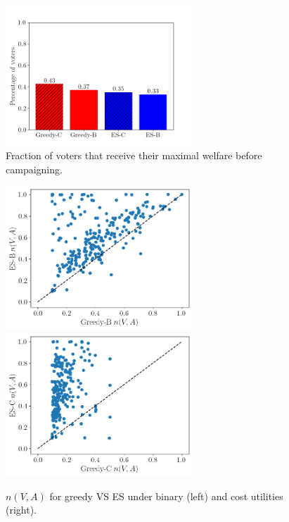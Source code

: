 \documentclass[mnsc,blindrev]{informs3_freeuse} %
\newcommand{\kibitz}[2]{\ifnum\Comments=1{\color{#1}{#2}}\fi}
\newcommand{\gb}[1]{\kibitz{red}{[GB:#1]}}
\newcommand{\mes}{ES}
\begin{document}
 

\begin{figure}[!h]
\begin{center}
\includegraphics[width=7cm]{../experiment/unchanged_percent.png}
\caption{Fraction of voters that receive their maximal welfare before campaigning. %
}\label{fig:pabulib:unchanged}
\end{center}
\vspace{-3mm}
\end{figure}

\begin{figure}[!h]
\begin{center}
\includegraphics[width=7cm]{../experiment/resp_01.png}
\includegraphics[width=7cm]{../experiment/resp_cost.png}
\caption{$n(V, A)$ for greedy VS \mes{} under binary (left) and cost utilities (right). 
}\label{fig:pabulib:resp}
\end{center}
\vspace{-3mm}
\end{figure}
\end{document}
